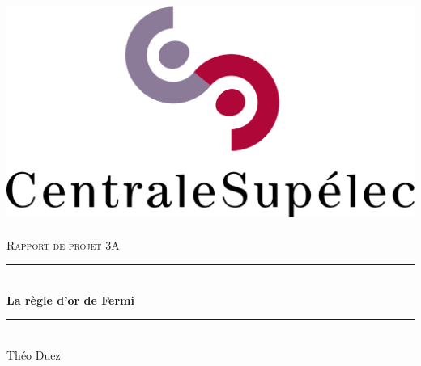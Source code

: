 \documentclass[12pt,openany,a4paper, titlepage]{article}
\theoremstyle{definition}
\theoremstyle{definition}
\theoremstyle{definition}
\theoremstyle{definition}
\theoremstyle{definition}
\theoremstyle{definition}
\newcommand{\HRule}{\rule{\linewidth}{0.5mm}} %
\begin{document}
\begin{titlepage}
\begin{sffamily}
\begin{center}

\includegraphics[scale=0.13]{logoCS.png}~\\[1.5cm]

\textsc{\LARGE Rapport de projet 3A}\\[1.5cm]

\HRule{} \\[0.4cm]
{\huge \bfseries La règle d'or de Fermi}
\HRule{} \\[1cm]

{\large Théo Duez}\\[2cm]


\end{center}
\end{sffamily}
\end{titlepage}
\end{document}
